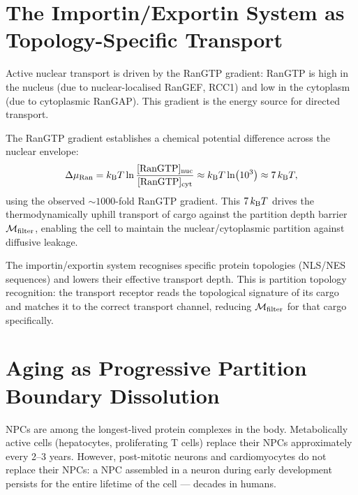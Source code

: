 \section{The Importin/Exportin System as Topology-Specific Transport}
\label{sec:importin_exportin}

Active nuclear transport is driven by the RanGTP gradient: RanGTP is high
in the nucleus (due to nuclear-localised RanGEF, RCC1) and low in the cytoplasm
(due to cytoplasmic RanGAP). This gradient is the energy source for directed
transport.

\begin{proposition}
\label{prop:ran_gradient}
The RanGTP gradient establishes a chemical potential difference across the
nuclear envelope:
\begin{equation}
  \Delta\mu_{\mathrm{Ran}} = k_{\mathrm{B}} T \ln\frac{[\mathrm{RanGTP}]_{\mathrm{nuc}}}{[\mathrm{RanGTP}]_{\mathrm{cyt}}}
  \approx k_{\mathrm{B}} T \ln(10^3) \approx 7\,k_{\mathrm{B}} T,
  \label{eq:ran_gradient}
\end{equation}
using the observed $\sim 1000$-fold RanGTP gradient. This $7\,k_{\mathrm{B}} T$ drives
the thermodynamically uphill transport of cargo against the partition depth
barrier $\mathcal{M}_{\mathrm{filter}}$, enabling the cell to maintain the
nuclear/cytoplasmic partition against diffusive leakage.
\end{proposition}

The importin/exportin system recognises specific protein topologies (NLS/NES
sequences) and lowers their effective transport depth. This is partition
topology recognition: the transport receptor reads the topological signature
of its cargo and matches it to the correct transport channel, reducing
$\mathcal{M}_{\mathrm{filter}}$ for that cargo specifically.

\section{Aging as Progressive Partition Boundary Dissolution}
\label{sec:aging_npc}

NPCs are among the longest-lived protein complexes in the body. Metabolically
active cells (hepatocytes, proliferating T cells) replace their NPCs
approximately every 2--3 years. However, post-mitotic neurons and
cardiomyocytes do not replace their NPCs: a NPC assembled in a neuron during
early development persists for the entire lifetime of the cell --- decades in
humans.

